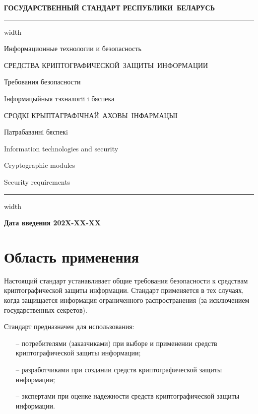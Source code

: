 \newpage
\setcounter{page}{1}
\pagestyle{headings}

\begin{center}
{\bfseries
ГОСУДАРСТВЕННЫЙ СТАНДАРТ РЕСПУБЛИКИ~БЕЛАРУСЬ
\vskip 2pt
\hrule width\textwidth

\vskip 9pt

Информационные технологии и безопасность

СРЕДСТВА КРИПТОГРАФИЧЕСКОЙ~ЗАЩИТЫ~ИНФОРМАЦИИ

Требования безопасности

\vskip 9pt

Iнформацыйныя тэхналогii i бяспека

СРОДКI КРЫПТАГРАФIЧНАЙ~АХОВЫ~IНФАРМАЦЫI

Патрабаваннi бяспекi
}

\vskip 9pt

Information technologies and security

Cryptographic modules

Security requirements

\vskip 4pt                
\hrule width \textwidth
\end{center}

\mbox{}\hfill{\bfseries Дата введения 202X-XX-XX}

\chapter{Область применения}\label{SCOPE}

Настоящий стандарт устанавливает общие требования безопасности к средствам
криптографической защиты информации. Стандарт применяется в тех 
случаях, когда защищается информация ограниченного распространения (за 
исключением государственных секретов).

Стандарт предназначен для использования:
\begin{itemize}
\item[--]
потребителями (заказчиками) при выборе и применении средств криптографической
защиты информации;

\item[--]
разработчиками при создании средств криптографической защиты информации;

\item[--]
экспертами при оценке надежности средств криптографической защиты 
информации. 
\end{itemize}


